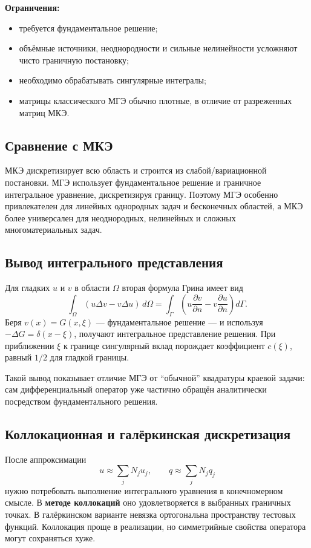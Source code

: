 \textbf{Ограничения:}
\begin{itemize}
\item требуется фундаментальное решение;
\item объёмные источники, неоднородности и сильные нелинейности усложняют чисто граничную постановку;
\item необходимо обрабатывать сингулярные интегралы;
\item матрицы классического МГЭ обычно плотные, в отличие от разреженных матриц МКЭ.
\end{itemize}

\subsection{Сравнение с МКЭ}

МКЭ дискретизирует всю область и строится из слабой/вариационной постановки. МГЭ использует фундаментальное решение и граничное интегральное уравнение, дискретизируя границу. Поэтому МГЭ особенно привлекателен для линейных однородных задач и бесконечных областей, а МКЭ более универсален для неоднородных, нелинейных и сложных многоматериальных задач.


\subsection{Вывод интегрального представления}

Для гладких $u$ и $v$ в области $\Omega$ вторая формула Грина имеет вид
\[
\int_\Omega (u\Delta v-v\Delta u)\,d\Omega
=
\int_\Gamma
\left(u\frac{\partial v}{\partial n}
-v\frac{\partial u}{\partial n}\right)d\Gamma.
\]
Беря $v(x)=G(x,\xi)$ --- фундаментальное решение --- и используя
$-\Delta G=\delta(x-\xi)$, получают интегральное представление решения.
При приближении $\xi$ к границе сингулярный вклад порождает коэффициент
$c(\xi)$, равный $1/2$ для гладкой границы.

Такой вывод показывает отличие МГЭ от ``обычной'' квадратуры краевой задачи:
сам дифференциальный оператор уже частично обращён аналитически посредством
фундаментального решения.

\subsection{Коллокационная и галёркинская дискретизация}

После аппроксимации
\[
u\approx\sum_jN_j u_j,
\qquad
q\approx\sum_jN_j q_j
\]
нужно потребовать выполнение интегрального уравнения в конечномерном смысле.
В \textbf{методе коллокаций} оно удовлетворяется в выбранных граничных точках.
В галёркинском варианте невязка ортогональна пространству тестовых функций.
Коллокация проще в реализации, но симметрийные свойства оператора могут
сохраняться хуже.

